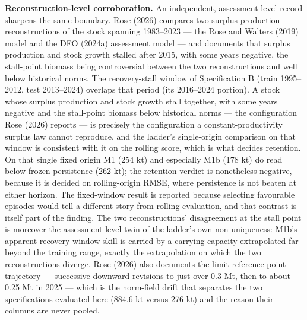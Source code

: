 \documentclass[11pt]{article}
\begin{document}
\textbf{Reconstruction-level corroboration.} An independent,
assessment-level record sharpens the same boundary. Rose (2026) compares
two surplus-production reconstructions of the stock spanning 1983--2023
--- the Rose and Walters (2019) model and the DFO (2024a) assessment
model --- and documents that surplus production and stock growth stalled
after 2015, with some years negative, the stall-point biomass being
controversial between the two reconstructions and well below historical
norms. The recovery-stall window of Specification B (train 1995--2012,
test 2013--2024) overlaps that period (its 2016--2024 portion). A stock
whose surplus production and stock growth stall together, with some
years negative and the stall-point biomass below historical norms ---
the configuration Rose (2026) reports --- is precisely the configuration
a constant-productivity surplus law cannot reproduce, and the ladder's
single-origin comparison on that window is consistent with it on the
rolling score, which is what decides retention. On that single fixed
origin M1 (254 kt) and especially M1b (178 kt) do read below frozen
persistence (262 kt); the retention verdict is nonetheless negative,
because it is decided on rolling-origin RMSE, where persistence is not
beaten at either horizon. The fixed-window result is reported because
selecting favourable episodes would tell a different story from rolling
evaluation, and that contrast is itself part of the finding. The two reconstructions' disagreement
at the stall point is moreover the assessment-level twin of the ladder's
own non-uniqueness: M1b's apparent recovery-window skill is carried by a
carrying capacity extrapolated far beyond the training range, exactly
the extrapolation on which the two reconstructions diverge. Rose (2026)
also documents the limit-reference-point trajectory --- successive
downward revisions to just over 0.3 Mt, then to about 0.25 Mt in 2025
--- which is the norm-field drift that separates the two specifications
evaluated here (884.6 kt versus 276 kt) and the reason their columns are
never pooled.
\end{document}

